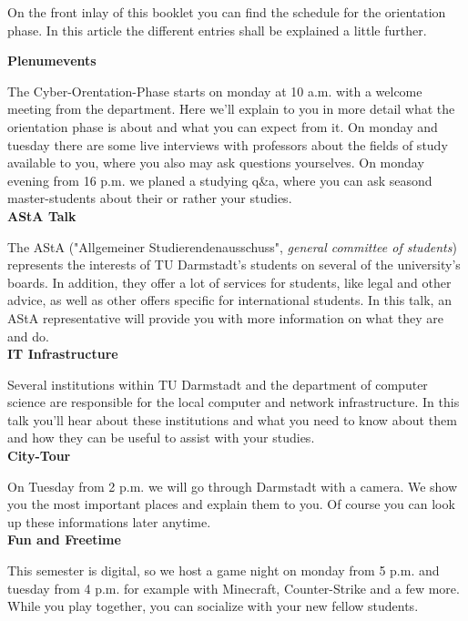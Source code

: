 {On the front inlay of this booklet you can find the schedule for the orientation phase. In this article the different entries shall be explained a little further.}
{\textbf{Plenumevents}

    The Cyber-Orentation-Phase starts on monday at 10 a.m. with a welcome meeting from the department. Here we’ll explain to you in more detail what the orientation phase is about and what you can expect from it. On monday and tuesday there are some live interviews with professors about the fields of study available to you, where you also may ask questions yourselves. On monday evening from 16 p.m. we planed a studying q\&a, where you can ask seasond master-students about their or rather your studies.\\

    \noindent\textbf{AStA Talk}

    The AStA ("Allgemeiner Studierendenausschuss", \textit{general committee of students}) represents the interests of TU Darmstadt's students on several of the university's boards. In addition, they offer a lot of services for students, like legal and other advice, as well as other offers specific for international students. In this talk, an AStA representative will provide you with more information on what they are and do.\\

    \noindent\textbf{IT Infrastructure}

    Several institutions within TU Darmstadt and the department of computer science are responsible for the local computer and network infrastructure. In this talk you'll hear about these institutions and what you need to know about them and how they can be useful to assist with your studies.\\

    \noindent\textbf{City-Tour}

    On Tuesday from 2 p.m. we will go through Darmstadt with a camera. We show you the most important places and explain them to you. Of course you can look up these informations later anytime.\\

    \noindent\textbf{Fun and Freetime}

    This semester is digital, so we host a game night on monday from 5 p.m. and tuesday from 4 p.m. for example with Minecraft, Counter-Strike and a few more. While you play together, you can socialize with your new fellow students.
}{}
